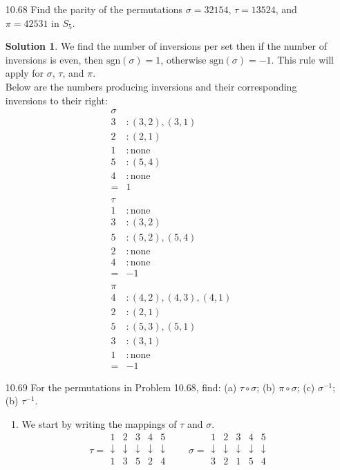 \documentclass[12pt]{article}
\theoremstyle{definition}
\newtheorem*{solution}{Solution} %
\theoremstyle{plain}
\begin{document}
\begin{enumerate}
\item[10.68]Find the parity of the permutations $\sigma = 32154$, $\tau = 13524$, and $\pi = 42531$ in $S_5$.\\
	\begin{solution}
	We find the number of inversions per set then if the number of inversions is even, then $\mathrm{sgn}(\sigma) = 1$, otherwise $\mathrm{sgn}(\sigma)=-1$. This rule will apply for $\sigma$, $\tau$, and $\pi$.\\
	Below are the numbers producing inversions and their corresponding inversions to their right:
	\begin{align*}
	\sigma&\\
	3&: (3,2),(3,1)\\
	2&: (2,1)\\
	1&: \mathrm{none}\\
	5&: (5,4)\\
	4&: \mathrm{none}\\
	=& 1\\
	{}\\
	\tau&\\
	1&: \mathrm{none}\\
	3&: (3,2)\\
	5&: (5,2),(5,4)\\
	2&: \mathrm{none}\\
	4&: \mathrm{none}\\
	=& -1\\
	{}\\
	\pi&\\
	4&: (4,2),(4,3),(4,1)\\
	2&: (2,1)\\
	5&: (5,3),(5,1)\\
	3&: (3,1)\\
	1&: \mathrm{none}\\
	=& -1
	\end{align*}
	\end{solution}
\item[10.69]For the permutations in Problem 10.68, find: (a) $\tau\circ\sigma$; (b) $\pi\circ\sigma$; (c) $\sigma^{-1}$; (b) $\tau^{-1}$.
	\begin{enumerate}
	\item We start by writing the mappings of $\tau$ and $\sigma$.
	\[ \tau = \begin{matrix}1&2&3&4&5\\\downarrow&\downarrow&\downarrow&\downarrow&\downarrow\\1&3&5&2&4\\\end{matrix} \qquad \sigma = \begin{matrix}1&2&3&4&5\\\downarrow&\downarrow&\downarrow&\downarrow&\downarrow\\3&2&1&5&4\\\end{matrix} \]

\end{enumerate}
\end{enumerate}
\end{document}
